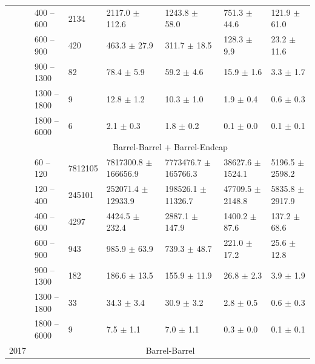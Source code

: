 \begin{table}[htp]
\begin{center}
{\begin{tabular}{|l|l|l|l|l|l|l|}
& 400   -- 600   & 2134        & 2117.0     $\pm$ 112.6    & 1243.8     $\pm$ 58.0             & 751.3      $\pm$ 44.6      & 121.9      $\pm$ 61.0     \\
& 600   -- 900   & 420         & 463.3      $\pm$ 27.9     & 311.7      $\pm$ 18.5             & 128.3      $\pm$ 9.9       & 23.2       $\pm$ 11.6     \\
& 900   -- 1300  & 82          & 78.4       $\pm$ 5.9      & 59.2       $\pm$ 4.6              & 15.9       $\pm$ 1.6       & 3.3        $\pm$ 1.7      \\
& 1300  -- 1800  & 9           & 12.8       $\pm$ 1.2      & 10.3       $\pm$ 1.0              & 1.9        $\pm$ 0.4       & 0.6        $\pm$ 0.3      \\
& 1800  -- 6000  & 6           & 2.1        $\pm$ 0.3      & 1.8        $\pm$ 0.2              & 0.1        $\pm$ 0.0       & 0.1        $\pm$ 0.1      \\ \cline{2-7}
&\multicolumn{6}{c|}{Barrel-Barrel + Barrel-Endcap} \\ \cline{2-7}
& 60    -- 120   & 7812105     & 7817300.8  $\pm$ 166656.9 & 7773476.7  $\pm$ 165766.3         & 38627.6    $\pm$ 1524.1    & 5196.5     $\pm$ 2598.2   \\
& 120   -- 400   & 245101      & 252071.4   $\pm$ 12933.9  & 198526.1   $\pm$ 11326.7          & 47709.5    $\pm$ 2148.8    & 5835.8     $\pm$ 2917.9   \\
& 400   -- 600   & 4297        & 4424.5     $\pm$ 232.4    & 2887.1     $\pm$ 147.9            & 1400.2     $\pm$ 87.6      & 137.2      $\pm$ 68.6     \\
& 600   -- 900   & 943         & 985.9      $\pm$ 63.9     & 739.3      $\pm$ 48.7             & 221.0      $\pm$ 17.2      & 25.6       $\pm$ 12.8     \\
& 900   -- 1300  & 182         & 186.6      $\pm$ 13.5     & 155.9      $\pm$ 11.9             & 26.8       $\pm$ 2.3       & 3.9        $\pm$ 1.9      \\
& 1300  -- 1800  & 33          & 34.3       $\pm$ 3.4      & 30.9       $\pm$ 3.2              & 2.8        $\pm$ 0.5       & 0.6        $\pm$ 0.3      \\
& 1800  -- 6000  & 9           & 7.5        $\pm$ 1.1      & 7.0        $\pm$ 1.1              & 0.3        $\pm$ 0.0       & 0.1        $\pm$ 0.1      \\  \cline{2-7} \hline \hline
\multirow{24}{*}{2017}& \multicolumn{6}{c|}{Barrel-Barrel} \\ \cline{2-7}

\end{tabular}}
\end{center}
\end{table}
